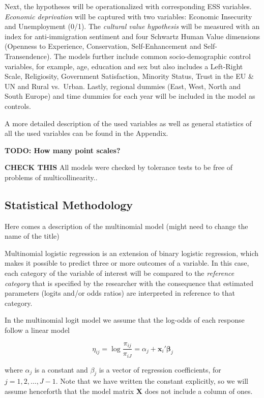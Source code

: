 \documentclass[]{article}
\begin{document}
Next, the hypotheses will be operationalized with corresponding ESS
variables. \emph{Economic deprivation} will be captured with two
variables: Economic Insecurity and Unemployment (0/1). The
\emph{cultural value hypothesis} will be measured with an index for
anti-immigration sentiment and four Schwartz Human Value dimensions
(Openness to Experience, Conservation, Self-Enhancement and
Self-Transendence). The models further include common socio-demographic
control variables, for example, age, education and sex but also includes
a Left-Right Scale, Religiosity, Government Satisfaction, Minority
Status, Trust in the EU \& UN and Rural vs.~Urban. Lastly, regional
dummies (East, West, North and South Europe) and time dummies for each
year will be included in the model as controls.

A more detailed description of the used variables as well as general
statistics of all the used variables can be found in the Appendix.

\textbf{TODO: How many point scales?}

\textbf{CHECK THIS} All models were checked by tolerance tests to be
free of problems of multicollinearity..

\subsection{Statistical Methodology}\label{statistical-methodology}

Here comes a description of the multinomial model (might need to change
the name of the title)

Multinomial logistic regression is an extension of binary logistic
regression, which makes it possible to predict three or more outcomes of
a variable. In this case, each category of the variable of interest will
be compared to the \emph{reference category} that is specified by the
researcher with the consequence that estimated parameters (logits and/or
odds ratios) are interpreted in reference to that category.

In the multinomial logit model we assume that the log-odds of each
response follow a linear model

\[\eta_{ij} = \log\frac{\pi_{ij}}{\pi_{iJ}} = \alpha_j + \boldsymbol{x}_i'\boldsymbol{\beta}_j\]

where \(\alpha_j\) is a constant and \(\beta_j\) is a vector of
regression coefficients, for \(j = 1, 2, \ldots, J-1\). Note that we
have written the constant explicitly, so we will assume henceforth that
the model matrix \(\boldsymbol{X}\) does not include a column of ones.
\end{document}
